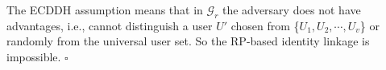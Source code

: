 The ECDDH assumption means that in $\mathcal{G}_r$ the adversary does not have advantages,
    i.e., cannot distinguish a user $U'$ chosen from \{${U_1}, {U_2}, \cdots, {U_v}$\}
        or randomly from the universal user set.
So the RP-based identity linkage is impossible. $\square$




